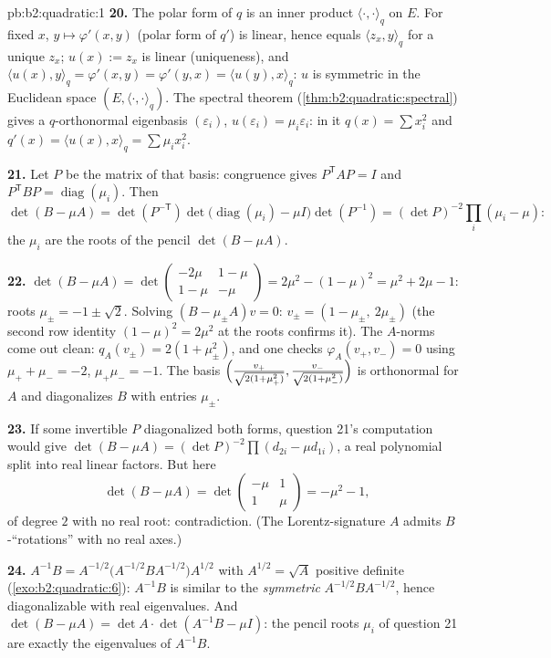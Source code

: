 \begin{solution}{pb:b2:quadratic:1}
\textbf{20.} The polar form of $q$ is an inner product
$\langle\cdot,\cdot\rangle_q$ on $E$. For fixed $x$, $y \mapsto
\varphi'(x, y)$ (polar form of $q'$) is linear, hence equals
$\langle z_x, y\rangle_q$ for a unique $z_x$; $u(x) := z_x$ is
linear (uniqueness), and $\langle u(x), y\rangle_q =
\varphi'(x,y) = \varphi'(y,x) = \langle u(y), x\rangle_q$: $u$
is symmetric in the Euclidean space $(E,
\langle\cdot,\cdot\rangle_q)$. The spectral theorem
(\cref{thm:b2:quadratic:spectral}) gives a $q$-orthonormal
eigenbasis $(\varepsilon_i)$, $u(\varepsilon_i) =
\mu_i\varepsilon_i$: in it $q(x) = \sum x_i^2$ and $q'(x) =
\langle u(x), x\rangle_q = \sum\mu_ix_i^2$.

\textbf{21.} Let $P$ be the matrix of that basis: congruence
gives $P^{\mathsf T}AP = I$ and $P^{\mathsf T}BP =
\operatorname{diag}(\mu_i)$. Then
\[
\det(B - \mu A) = \det(P^{-\mathsf T})
\det\bigl(\operatorname{diag}(\mu_i) - \mu I\bigr)
\det(P^{-1})
= (\det P)^{-2}\prod_i(\mu_i - \mu) :
\]
the $\mu_i$ are the roots of the pencil $\det(B - \mu A)$.

\textbf{22.} $\det(B - \mu A) =
\det\begin{pmatrix} -2\mu & 1-\mu\\ 1-\mu & -\mu\end{pmatrix}
= 2\mu^2 - (1-\mu)^2 = \mu^2 + 2\mu - 1$: roots $\mu_\pm = -1
\pm \sqrt2$. Solving $(B - \mu_\pm A)v = 0$: $v_\pm = (1 -
\mu_\pm,\ 2\mu_\pm)$ (the second row identity $(1-\mu)^2 =
2\mu^2$ at the roots confirms it). The $A$-norms come out
clean: $q_A(v_\pm) = 2(1 + \mu_\pm^2)$, and one checks
$\varphi_A(v_+, v_-) = 0$ using $\mu_+ + \mu_- = -2$,
$\mu_+\mu_- = -1$. The basis $\Bigl(\frac{v_+}{\sqrt{2(1 +
\mu_+^2)}}, \frac{v_-}{\sqrt{2(1+\mu_-^2)}}\Bigr)$ is
orthonormal for $A$ and diagonalizes $B$ with entries
$\mu_\pm$.

\textbf{23.} If some invertible $P$ diagonalized both forms,
question 21's computation would give $\det(B - \mu A) = (\det
P)^{-2}\prod(d_{2i} - \mu d_{1i})$, a real polynomial split
into real linear factors. But here
\[
\det(B - \mu A) = \det\begin{pmatrix} -\mu & 1\\ 1 &
\mu\end{pmatrix} = -\mu^2 - 1 ,
\]
of degree $2$ with no real root: contradiction. (The
Lorentz-signature $A$ admits $B$-``rotations'' with no real
axes.)

\textbf{24.} $A^{-1}B = A^{-1/2}\bigl(A^{-1/2}BA^{-1/2}\bigr)
A^{1/2}$ with $A^{1/2} = \sqrt A$ positive definite
(\cref{exo:b2:quadratic:6}): $A^{-1}B$ is similar to the
\emph{symmetric} $A^{-1/2}BA^{-1/2}$, hence diagonalizable with
real eigenvalues. And $\det(B - \mu A) = \det A\cdot
\det(A^{-1}B - \mu I)$: the pencil roots $\mu_i$ of question
21 are exactly the eigenvalues of $A^{-1}B$.


\end{solution}
